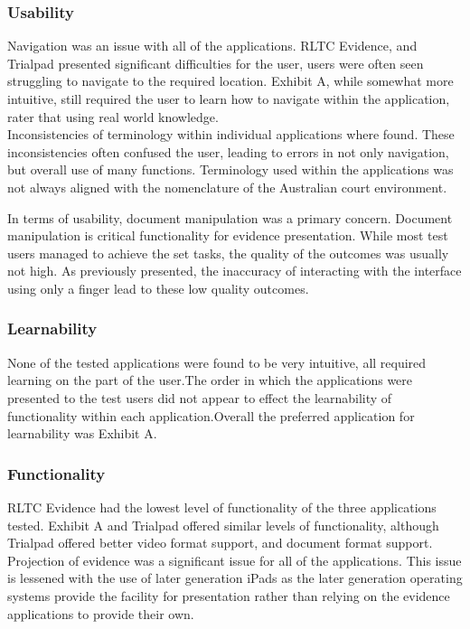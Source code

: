 \subsubsection{Usability}
Navigation was an issue with all of the applications. RLTC Evidence, and Trialpad presented significant difficulties for the user, users were often seen struggling to navigate to the required location. Exhibit A, while somewhat more intuitive, still required the user to learn how to navigate within the application, rater that using real world knowledge. \\
Inconsistencies of terminology within individual applications where found. These inconsistencies often confused the user, leading to errors in not only navigation, but overall use of many functions. Terminology used within the applications was not always aligned with the nomenclature of the Australian court environment.




In terms of usability, document manipulation was a primary concern. Document manipulation is critical functionality for evidence presentation. While most test users managed to achieve the set tasks, the quality of the outcomes was usually not high. As previously presented, the inaccuracy of interacting with the interface using only a finger lead to these low quality outcomes.
\subsubsection{Learnability}
None of the tested applications were found to be very intuitive, all required learning on the part of the user.The order in which the applications were presented to the test users did not appear to effect the learnability of functionality within each application.Overall the preferred application for learnability was Exhibit A.
\subsubsection{Functionality}
RLTC Evidence had the lowest level of functionality of the three applications tested. Exhibit A and Trialpad offered similar levels of functionality, although Trialpad offered better video format support, and document format support.\\
Projection of evidence was a significant issue for all of the applications. This issue is lessened with the use of later generation iPads as the later generation operating systems provide the facility for presentation rather than relying on the evidence applications to provide their own.\\
